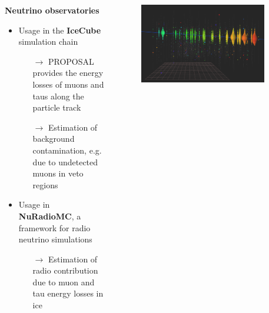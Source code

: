 \begin{frame}[c]
    \begin{columns}[onlytextwidth]
    \begin{column}{0.55\textwidth}
    \textbf{Neutrino observatories}
        \begin{itemize}
            \item Usage in the \textbf{IceCube} simulation chain
            \begin{itemize}
                \item[$\rightarrow$] PROPOSAL provides the energy losses of muons and taus along the particle track
                \item[$\rightarrow$] Estimation of background contamination, e.g. due to undetected muons in veto regions
            \end{itemize}
            \item Usage in \textbf{NuRadioMC}, a framework for radio neutrino simulations
            \begin{itemize}
                \item[$\rightarrow$] Estimation of radio contribution due to muon and tau energy losses in ice
            \end{itemize}
        \end{itemize}
    \end{column}
        \begin{column}{0.45\textwidth}
            \begin{figure}
                \centering
                \includegraphics[width=0.9\textwidth]{images/Track.png}
            \end{figure}
        \end{column}
    \end{columns}
\end{frame}


